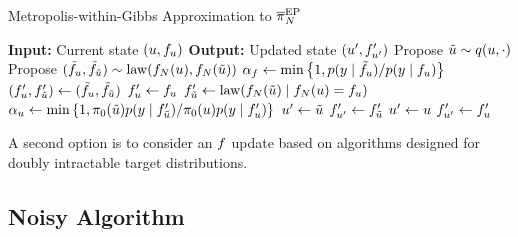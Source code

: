 \documentclass[12pt]{article}
\begin{document}
\begin{algorithm}
    \caption{Metropolis-within-Gibbs Approximation to ${\overline{\pi}}_{N}^{\mathrm{EP}}$}
    \label{alg:mwg-ep}
    \begin{algorithmic}[1] 
    \State \textbf{Input:} Current state $(u, f_u)$
    \State \textbf{Output:} Updated state $(u^\prime, f^\prime_{u^\prime})$
     \State Propose $\tilde{u} \sim q(u, \cdot)$
     \State Propose $(\tilde{f}_u, \tilde{f}_{\tilde{u}}) \sim \mathrm{law}(f_{N}(u), f_{N}(\tilde{u}))$ 
     \State $\alpha_{f} \gets \min\left\{1, p(y \mid \tilde{f}_u) / p(y \mid f_u) \right\}$
                \State $(f^\prime_u, f^\prime_{\tilde{u}}) \gets (\tilde{f}_u, \tilde{f}_{\tilde{u}})$ 
            \Else
                \State $f^\prime_{u} \gets f_{u}$
                \State $f^\prime_{\tilde{u}} \gets \mathrm{law}(f_{N}(\tilde{u}) \mid f_{N}(u) = f_u)$
            \EndIf
      \State $\alpha_{u} \gets \min\left\{1, \pi_0(\tilde{u} )p(y \mid f^\prime_{\tilde{u}}) / \pi_0(u) p(y \mid f^\prime_{u}) \right\}$ 
                \State $u^\prime \gets \tilde{u}$
                \State $f^\prime_{u^\prime} \gets f^\prime_{\tilde{u}}$ 
            \Else
            	\State $u^\prime \gets u$
		\State $f^\prime_{u^\prime} \gets f^\prime_{u}$
            \EndIf
    \end{algorithmic}
\end{algorithm}

A second option is to consider an $f$ update based on algorithms designed 
for doubly intractable target distributions. 














\subsection{Noisy Algorithm}
\end{document}
